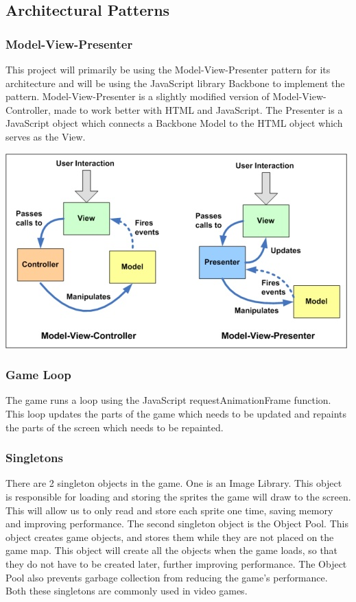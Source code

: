 \subsection{Architectural Patterns}

\subsubsection*{Model-View-Presenter}
This project will primarily be using the Model-View-Presenter pattern for its architecture and will 
be using the JavaScript library Backbone to implement the pattern. Model-View-Presenter is a slightly
modified version of Model-View-Controller, made to work better with HTML and JavaScript. The Presenter
is a JavaScript object which connects a Backbone Model to the HTML object which serves as the View.

\includegraphics{pictures/mvc_mvp}

\subsubsection*{Game Loop}
The game runs a loop using the JavaScript requestAnimationFrame function. This loop updates the parts 
of the game which needs to be updated and repaints the parts of the screen which needs to be repainted.

\subsubsection*{Singletons}
There are 2 singleton objects in the game. One is an Image Library. This object is responsible for 
loading and storing the sprites the game will draw to the screen. This will allow us to only read and 
store each sprite one time, saving memory and improving performance. The second singleton object is 
the Object Pool. This object creates game objects, and stores them while they are not placed on the 
game map. This object will create all the objects when the game loads, so that they do not have to 
be created later, further improving performance. The Object Pool also prevents garbage collection 
from reducing the game's performance. Both these singletons are commonly used in video games.
